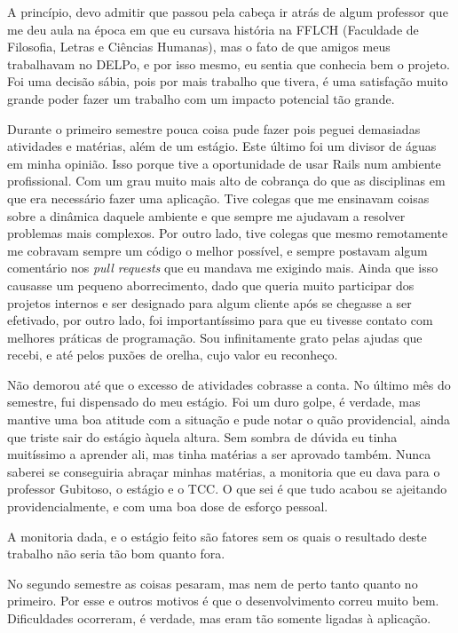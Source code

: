 A princípio, devo admitir que passou pela cabeça ir atrás de algum professor que me deu aula na época em que eu cursava
história na FFLCH (Faculdade de Filosofia, Letras e Ciências Humanas), mas o fato de que amigos meus trabalhavam no DELPo,
e por isso mesmo, eu sentia que conhecia bem o projeto. Foi uma decisão sábia, pois por mais trabalho que tivera, é uma
satisfação muito grande poder fazer um trabalho com um impacto potencial tão grande.

Durante o primeiro semestre pouca coisa pude fazer pois peguei demasiadas atividades e matérias, além de um estágio. Este
último foi um divisor de águas em minha opinião. Isso porque tive a oportunidade de usar Rails num ambiente profissional.
Com um grau muito mais alto de cobrança do que as disciplinas em que era necessário fazer uma aplicação. Tive colegas que
me ensinavam coisas sobre a dinâmica daquele ambiente e que sempre me ajudavam a resolver problemas mais complexos. Por
outro lado, tive colegas que mesmo remotamente me cobravam sempre um código o melhor possível, e sempre postavam algum
comentário nos \emph{pull requests} que eu mandava me exigindo mais. Ainda que isso causasse um pequeno aborrecimento,
dado que queria muito participar dos projetos internos e ser designado para algum cliente após se chegasse a ser efetivado,
por outro lado, foi importantíssimo para que eu tivesse contato com melhores práticas de programação. Sou infinitamente
grato pelas ajudas que recebi, e até pelos puxões de orelha, cujo valor eu reconheço.

Não demorou até que o excesso de atividades cobrasse a conta. No último mês do semestre, fui dispensado do meu estágio.
Foi um duro golpe, é verdade, mas mantive uma boa atitude com a situação e pude notar o quão providencial, ainda que triste
sair do estágio àquela altura. Sem sombra de dúvida eu tinha muitíssimo a aprender ali, mas tinha matérias a ser aprovado
também. Nunca saberei se conseguiria abraçar minhas matérias, a monitoria que eu dava para o professor Gubitoso, o estágio
e o TCC. O que sei é que tudo acabou se ajeitando providencialmente, e com uma boa dose de esforço pessoal.

A monitoria dada, e o estágio feito são fatores sem os quais o resultado deste trabalho não seria tão bom quanto fora.

No segundo semestre as coisas pesaram, mas nem de perto tanto quanto no primeiro. Por esse e outros motivos é que o
desenvolvimento correu muito bem. Dificuldades ocorreram, é verdade, mas eram tão somente ligadas à aplicação.

